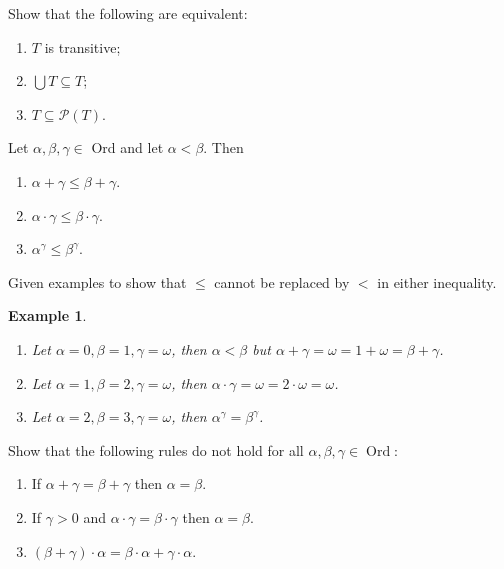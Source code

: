 \documentclass{ctexart}
\DeclareMathOperator{\ord}{Ord}
\newtheorem{example}{Example}
\begin{document}
\begin{problem}
Show that the following are equivalent:
\begin{enumerate}[ref=\theproblem.\arabic*]
\item\label{it:1} $T$ is transitive;
\item\label{it:2}$\bigcup T \subseteq T$;
\item\label{it:3} $T \subseteq \mathscr{P}(T)$.
\end{enumerate}
\end{problem}


\begin{problem}
Let $\alpha, \beta, \gamma \in$ Ord and let $\alpha<\beta$. Then
\begin{enumerate}[label=\alph*,ref=\theproblem.\alph*]
\item\label{it:11} $\alpha+\gamma \leq \beta+\gamma$.
\item\label{it:12} $\alpha \cdot \gamma \leq \beta \cdot \gamma$.
\item\label{it:13} $\alpha^\gamma \leq \beta^\gamma$.
\end{enumerate}
Given examples to show that $\leq$ cannot be replaced by $<$ in either inequality.
\end{problem}

\begin{example}
\begin{enumerate}[label=\alph*,ref=Example\theexample.\alph*]
\item\label{it:71} Let $\alpha=0,\beta=1,\gamma=\omega$, then $\alpha<\beta$ but $\alpha+\gamma=\omega=1+\omega=\beta+\gamma$. 
\item\label{it:72} Let $\alpha=1,\beta=2,\gamma=\omega$, then $\alpha\cdot \gamma=\omega=2\cdot\omega =\omega$. 
\item\label{it:73}  Let $\alpha=2,\beta=3,\gamma=\omega$, then $\alpha^\gamma=\beta^\gamma$. 
\end{enumerate}
\end{example}

\begin{problem}
Show that the following rules do not hold for all $\alpha, \beta, \gamma \in\ord$:
\begin{enumerate}[label=\alph*,ref=\theproblem.\alph*]
\item If $\alpha+\gamma=\beta+\gamma$ then $\alpha=\beta$.
\item If $\gamma>0$ and $\alpha \cdot \gamma=\beta \cdot \gamma$ then $\alpha=\beta$.
\item $(\beta+\gamma) \cdot \alpha=\beta \cdot \alpha+\gamma \cdot \alpha$.
\end{enumerate}
\end{problem}
\end{document}
